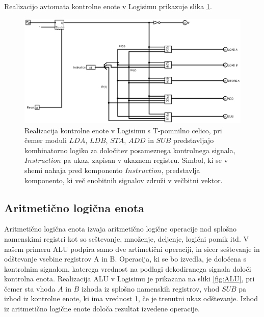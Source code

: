 Realizacijo avtomata kontrolne enote v Logisimu prikazuje slika \ref{fig:CU_logisim}.

\begin{figure}[htbf]%
\begin{center}
\includegraphics[width=0.75\columnwidth]{procesor/img/CU}%
\caption{Realizacija kontrolne enote v Logisimu s T-pomnilno celico, pri čemer moduli $LDA$, $LDB$, $STA$, $ADD$ in $SUB$ predstavljajo kombinatorno logiko za določitev posameznega kontrolnega signala, $Instruction$ pa ukaz, zapisan v ukaznem registru. Simbol, ki se v shemi nahaja pred komponento $Instruction$, predstavlja komponento, ki več enobitnih signalov združi v večbitni vektor.}%
\label{fig:CU_logisim}%
\end{center}
\end{figure}



\subsection{Aritmetično logična enota}
Aritmetično logična enota  izvaja aritmetično logične operacije nad splošno namenskimi registri kot so seštevanje, množenje, deljenje, logični pomik itd. V našem primeru ALU podpira samo dve artimetični operaciji, in sicer seštevanje in odštevanje vsebine registrov A in B. Operacija, ki se bo izvedla, je določena s kontrolnim signalom, katerega vrednost na podlagi dekodiranega signala določi kontrolna enota. Realizacija ALU v Logisimu je prikazana na sliki \ref{fig:ALU}, pri čemer sta vhoda $A$ in $B$ izhoda iz splošno namenskih registrov, vhod $SUB$ pa izhod iz kontrolne enote, ki ima vrednost 1, če je trenutni ukaz odštevanje. Izhod iz aritmetično logične enote določa rezultat izvedene operacije.

